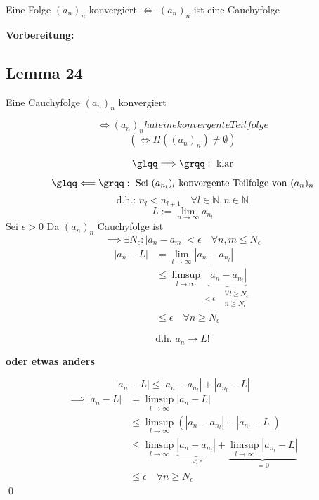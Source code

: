 \documentclass[fleqn]{scrbook}
\newcommand{\mqq}[1]{\text{\glqq} #1\text{\grqq}}
\renewenvironment{proof}{{\bfseries Beweis }}{\qed}
\begin{document}
Eine Folge $(a_n)_n$ konvergiert $\Longleftrightarrow$ $(a_n)_n$ ist eine Cauchyfolge

\textbf{Vorbereitung:} %

\subsection{Lemma 24}

Eine Cauchyfolge $(a_n)_n$ konvergiert

\[\Longleftrightarrow (a_n)_n hat eine konvergente Teilfolge\]
\[(\Longleftrightarrow H((a_n)_n) \neq \emptyset )\]

\begin{proof}
  \[\mqq{\Longrightarrow}: \text{ klar}\]
  \[\mqq{\Longleftarrow}: \text{ Sei } (a_{n_l})_l \text{ konvergente Teilfolge von } (a_n)_n\]
  \[\text{d.h.: } n_l < n_{l+1} \quad \forall l \in \mathbb{N},n\in \mathbb{N}\]
  \[L:= \lim_{n \to \infty} a_{n_l}\]
  Sei $\epsilon > 0$ Da $(a_n)_n$ Cauchyfolge ist
  \[\implies \exists N_\epsilon: |a_n-a_m| < \epsilon \quad \forall n,m \leq N_\epsilon\]
  \begin{align*}
    |a_n-L| & = \lim_{l \to \infty}|a_n-a_{n_l}| \\
            & \leq \limsup_{l \to \infty}\underbrace{|a_n-a_{n_l}|}_{<\epsilon \quad \substack{\forall l\geq N_\epsilon\\n\geq N_\epsilon}} \\
            & \leq \epsilon \quad \forall n \geq N_\epsilon
  \end{align*}

  \[\text{d.h. } a_n \to L!\]

\textbf{oder etwas anders}

  \[|a_n-L| \leq |a_n-a_{n_l}|+|a_{n_l}-L|\]
  \begin{align*}
    \implies |a_n-L| & = \limsup_{l\to\infty}|a_n-L| \\
                     & \leq \limsup_{l\to\infty}\left(|a_n-a_{n_l}|+|a_{n_l}-L|\right) \\
                     & \leq \limsup_{l\to\infty}\underbrace{|a_n-a_{n_l}|}_{<\epsilon}+\underbrace{\limsup_{l \to \infty} |a_{n_l}-L|}_{=0} \\
                     & \leq \epsilon \quad \forall n \geq N_\epsilon
  \end{align*}
\end{proof}
\end{document}
